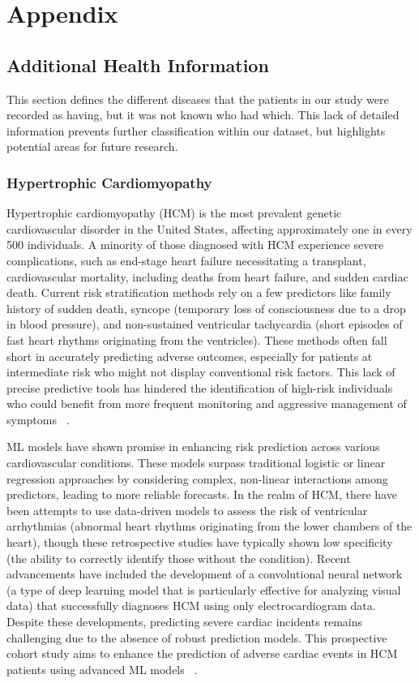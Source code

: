 \chapter{Appendix}
\label{cha:appendix}

\section{Additional Health Information}

This section defines the different diseases that the patients in our study were recorded as having, but it was not known who had which. This lack of detailed information prevents further classification within our dataset, but highlights potential areas for future research.

\subsection{Hypertrophic Cardiomyopathy}

Hypertrophic cardiomyopathy (HCM) is the most prevalent genetic cardiovascular disorder in the United States, affecting approximately one in every 500 individuals. A minority of those diagnosed with HCM experience severe complications, such as end-stage heart failure necessitating a transplant, cardiovascular mortality, including deaths from heart failure, and sudden cardiac death. Current risk stratification methods rely on a few predictors like family history of sudden death, syncope (temporary loss of consciousness due to a drop in blood pressure), and non-sustained ventricular tachycardia (short episodes of fast heart rhythms originating from the ventricles). These methods often fall short in accurately predicting adverse outcomes, especially for patients at intermediate risk who might not display conventional risk factors. This lack of precise predictive tools has hindered the identification of high-risk individuals who could benefit from more frequent monitoring and aggressive management of symptoms ~\cite{KOCHAV2021117}.

ML models have shown promise in enhancing risk prediction across various cardiovascular conditions. These models surpass traditional logistic or linear regression approaches by considering complex, non-linear interactions among predictors, leading to more reliable forecasts. In the realm of HCM, there have been attempts to use data-driven models to assess the risk of ventricular arrhythmias (abnormal heart rhythms originating from the lower chambers of the heart), though these retrospective studies have typically shown low specificity (the ability to correctly identify those without the condition). Recent advancements have included the development of a convolutional neural network (a type of deep learning model that is particularly effective for analyzing visual data) that successfully diagnoses HCM using only electrocardiogram data. Despite these developments, predicting severe cardiac incidents remains challenging due to the absence of robust prediction models. This prospective cohort study aims to enhance the prediction of adverse cardiac events in HCM patients using advanced ML models ~\cite{KOCHAV2021117}.

